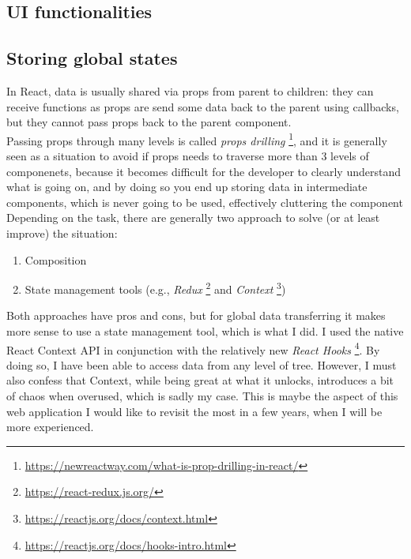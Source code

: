 \documentclass[]{usiinfbachelorproject}
\begin{document}
\subsection{UI functionalities}

\subsection{Storing global states} \label{storing states}

In React, data is usually shared via props from parent to children: they can receive functions as props are send some data back to the parent using callbacks, but they cannot pass props back to the parent component.\\ Passing props through many levels is called \emph{props drilling} \footnote{\url{https://newreactway.com/what-is-prop-drilling-in-react/}}, and it is generally seen as a situation to avoid if props needs to traverse more than 3 levels of componenets, because it becomes difficult for the developer to clearly understand what is going on, and by doing so you end up storing data in intermediate components, which is never going to be used, effectively cluttering the component\\

\noindent Depending on the task, there are generally two approach to solve (or at least improve) the situation:

\begin{enumerate}
	\item Composition
	\item State management tools (e.g., \emph{Redux} \footnote{\url{https://react-redux.js.org/}} and \emph{Context} \footnote{\url{https://reactjs.org/docs/context.html}})
\end{enumerate}

\noindent Both approaches have pros and cons, but for global data transferring it makes more sense to use a state management tool, which is what I did. I used the native React Context API in conjunction with the relatively new \emph{React Hooks} \footnote{\url{https://reactjs.org/docs/hooks-intro.html}}. By doing so, I have been able to access data from any level of tree. However, I must also confess that Context, while being great at what it unlocks, introduces a bit of chaos when overused, which is sadly my case. This is maybe the aspect of this web application I would like to revisit the most in a few years, when I will be more experienced.

\pagebreak
\end{document}
